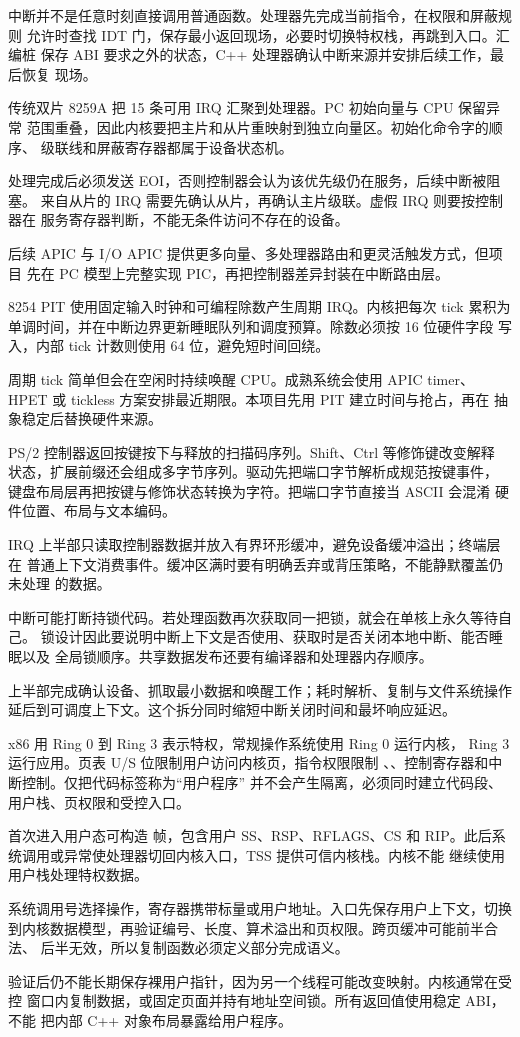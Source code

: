 中断并不是任意时刻直接调用普通函数。处理器先完成当前指令，在权限和屏蔽规则
允许时查找 IDT 门，保存最小返回现场，必要时切换特权栈，再跳到入口。汇编桩
保存 ABI 要求之外的状态，C++ 处理器确认中断来源并安排后续工作，最后恢复
现场。

传统双片 8259A 把 15 条可用 IRQ 汇聚到处理器。PC 初始向量与 CPU 保留异常
范围重叠，因此内核要把主片和从片重映射到独立向量区。初始化命令字的顺序、
级联线和屏蔽寄存器都属于设备状态机。

处理完成后必须发送 EOI，否则控制器会认为该优先级仍在服务，后续中断被阻塞。
来自从片的 IRQ 需要先确认从片，再确认主片级联。虚假 IRQ 则要按控制器在
服务寄存器判断，不能无条件访问不存在的设备。

后续 APIC 与 I/O APIC 提供更多向量、多处理器路由和更灵活触发方式，但项目
先在 PC 模型上完整实现 PIC，再把控制器差异封装在中断路由层。

8254 PIT 使用固定输入时钟和可编程除数产生周期 IRQ。内核把每次 tick 累积为
单调时间，并在中断边界更新睡眠队列和调度预算。除数必须按 16 位硬件字段
写入，内部 tick 计数则使用 64 位，避免短时间回绕。

周期 tick 简单但会在空闲时持续唤醒 CPU。成熟系统会使用 APIC timer、
HPET 或 tickless 方案安排最近期限。本项目先用 PIT 建立时间与抢占，再在
抽象稳定后替换硬件来源。

PS/2 控制器返回按键按下与释放的扫描码序列。Shift、Ctrl 等修饰键改变解释
状态，扩展前缀还会组成多字节序列。驱动先把端口字节解析成规范按键事件，
键盘布局层再把按键与修饰状态转换为字符。把端口字节直接当 ASCII 会混淆
硬件位置、布局与文本编码。

IRQ 上半部只读取控制器数据并放入有界环形缓冲，避免设备缓冲溢出；终端层在
普通上下文消费事件。缓冲区满时要有明确丢弃或背压策略，不能静默覆盖仍未处理
的数据。

中断可能打断持锁代码。若处理函数再次获取同一把锁，就会在单核上永久等待自己。
锁设计因此要说明中断上下文是否使用、获取时是否关闭本地中断、能否睡眠以及
全局锁顺序。共享数据发布还要有编译器和处理器内存顺序。

上半部完成确认设备、抓取最小数据和唤醒工作；耗时解析、复制与文件系统操作
延后到可调度上下文。这个拆分同时缩短中断关闭时间和最坏响应延迟。

x86 用 Ring 0 到 Ring 3 表示特权，常规操作系统使用 Ring 0 运行内核，
Ring 3 运行应用。页表 U/S 位限制用户访问内核页，指令权限限制
、、控制寄存器和中断控制。仅把代码标签称为“用户程序”
并不会产生隔离，必须同时建立代码段、用户栈、页权限和受控入口。

首次进入用户态可构造  帧，包含用户 SS、RSP、RFLAGS、CS 和
RIP。此后系统调用或异常使处理器切回内核入口，TSS 提供可信内核栈。内核不能
继续使用用户栈处理特权数据。

系统调用号选择操作，寄存器携带标量或用户地址。入口先保存用户上下文，切换
到内核数据模型，再验证编号、长度、算术溢出和页权限。跨页缓冲可能前半合法、
后半无效，所以复制函数必须定义部分完成语义。

验证后仍不能长期保存裸用户指针，因为另一个线程可能改变映射。内核通常在受控
窗口内复制数据，或固定页面并持有地址空间锁。所有返回值使用稳定 ABI，不能
把内部 C++ 对象布局暴露给用户程序。
